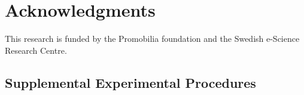 




\section*{Acknowledgments}
This research is funded by the Promobilia foundation and the Swedish
e-Science Research Centre.

{\small
}

\begin{subappendices}
	\renewcommand{\thesection}{\Roman{section}}
	
	
	
	\section{Supplemental Experimental Procedures}
	
	
	
	
	
	
	
\end{subappendices}
%



